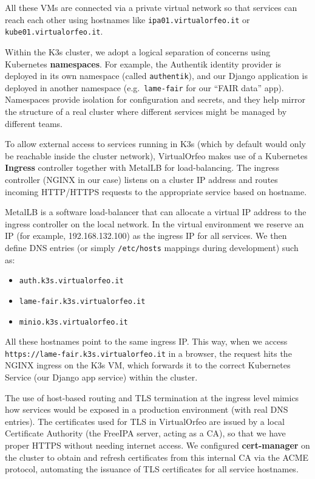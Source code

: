 All these VMs are connected via a private virtual network so that services can 
reach each other using hostnames like \texttt{ipa01.virtualorfeo.it} or 
\texttt{kube01.virtualorfeo.it}.

\medskip

Within the K3s cluster, we adopt a logical separation of concerns using 
Kubernetes \textbf{namespaces}. For example, the Authentik identity provider is 
deployed in its own namespace (called \texttt{authentik}), and our Django 
application is deployed in another namespace (e.g.\ \texttt{lame-fair} for our 
``FAIR data'' app). Namespaces provide isolation for configuration and secrets, 
and they help mirror the structure of a real cluster where different services 
might be managed by different teams.

\medskip

To allow external access to services running in K3s (which by default would only 
be reachable inside the cluster network), VirtualOrfeo makes use of a Kubernetes 
\textbf{Ingress} controller together with MetalLB for load-balancing. The ingress 
controller (NGINX in our case) listens on a cluster IP address and routes 
incoming HTTP/HTTPS requests to the appropriate service based on hostname. 

MetalLB is a software load-balancer that can allocate a virtual IP address to 
the ingress controller on the local network. In the virtual environment we 
reserve an IP (for example, 192.168.132.100) as the ingress IP for all services. 
We then define DNS entries (or simply \texttt{/etc/hosts} mappings during 
development) such as:  
\begin{itemize}
	\item \texttt{auth.k3s.virtualorfeo.it}  
	\item \texttt{lame-fair.k3s.virtualorfeo.it}  
	\item \texttt{minio.k3s.virtualorfeo.it}  
\end{itemize}

All these hostnames point to the same ingress IP. This way, when we access 
\texttt{https://lame-fair.k3s.virtualorfeo.it} in a browser, the request hits the 
NGINX ingress on the K3s VM, which forwards it to the correct Kubernetes Service 
(our Django app service) within the cluster. 

The use of host-based routing and TLS termination at the ingress level mimics 
how services would be exposed in a production environment (with real DNS 
entries). The certificates used for TLS in VirtualOrfeo are issued by a local 
Certificate Authority (the FreeIPA server, acting as a CA), so that we have 
proper HTTPS without needing internet access. We configured 
\textbf{cert-manager} on the cluster to obtain and refresh certificates from 
this internal CA via the ACME protocol, automating the issuance of TLS 
certificates for all service hostnames.

